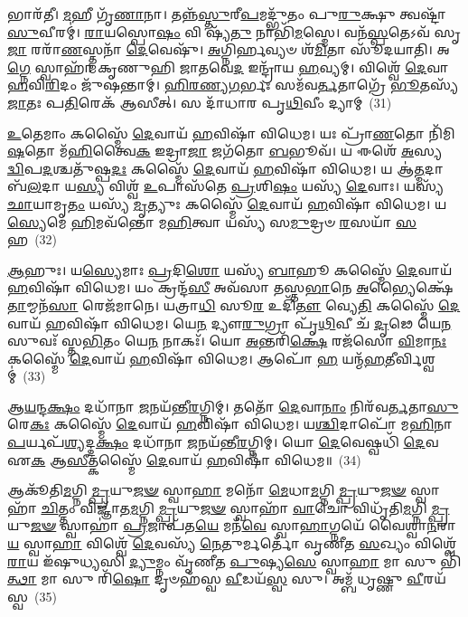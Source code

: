 𑌭𑌾𑌰᳴𑌤𑍀। \ul{𑌮}\-𑌹𑍀 𑌗𑍃᳴\-\ul{𑌣𑌾}\-𑌨𑌾। 𑌤𑌨𑍍𑌨᳴\-\ul{𑌸𑍍𑌤𑍁}\-𑌰𑍀\-\ul{𑌪}\-𑌮𑌦𑍍𑌭𑍁᳴𑌤𑌂 𑌪𑍁\-\ul{𑌰𑍁}\-𑌕𑍍𑌷𑍁 𑌤𑍍𑌵𑌷𑍍𑌟𑌾᳴ \ul{𑌸𑍁}\-𑌵𑍀𑌰𑌮𑍍॑। \ul{𑌰𑌾}\-𑌯𑌸𑍍𑌪𑍋\-\ul{𑌷𑌂} 𑌵𑌿 𑌷𑍍𑌯᳴\-\ul{𑌤𑍁} 𑌨𑌾𑌭𑌿᳴\-\ul{𑌮}\-𑌸𑍍𑌮𑍇। 𑌵𑌨᳴\-\ul{𑌸𑍍𑌪}\-𑌤𑍇\-𑌽𑌵᳴ 𑌸𑍃\-\ul{𑌜𑌾} 𑌰𑌰𑌾᳴\-\ul{𑌣}\-𑌸𑍍𑌤𑍍𑌮𑌨𑌾᳴ \ul{𑌦𑍇}\-𑌵𑍇𑌷𑍁᳴। \ul{𑌅}\-𑌗𑍍𑌨𑌿𑌰𑍍\mbox{}\-\ul{𑌹}\-𑌵𑍍𑌯𑍞 𑌶᳴\-\ul{𑌮𑌿}\-𑌤𑌾 𑌸𑍂᳴𑌦𑌯𑌾𑌤𑌿। 𑌅\-\ul{𑌗𑍍𑌨𑍇} 𑌸𑍍𑌵𑌾𑌹𑌾᳴ 𑌕𑍃𑌣𑍁𑌹𑌿 𑌜𑌾𑌤𑌵𑍇\-\ul{𑌦} 𑌇𑌨𑍍𑌦𑍍𑌰𑌾᳴𑌯 \ul{𑌹}\-𑌵𑍍𑌯𑌮𑍍। 𑌵𑌿𑌶𑍍𑌵𑍇᳴ \ul{𑌦𑍇}\-𑌵𑌾 \ul{𑌹}\-𑌵𑌿\-\ul{𑌰𑌿}\-𑌦𑌂 𑌜𑍁᳴𑌷𑌨𑍍𑌤𑌾𑌮𑍍। \ul{𑌹𑌿}\-\-\ul{𑌰}\-\-\ul{𑌣𑍍𑌯}\-\-\ul{𑌗}\-𑌰𑍍𑌭𑌃 𑌸𑌮᳴𑌵\-\ul{𑌰𑍍𑌤}\-𑌤𑌾𑌗𑍍𑌰𑍇᳴ \ul{𑌭𑍂}\-𑌤𑌸𑍍𑌯᳴ \ul{𑌜𑌾}\-𑌤𑌃 𑌪\-\ul{𑌤𑌿}\-𑌰𑍇𑌕᳴ 𑌆𑌸𑍀𑌤𑍍। 𑌸 𑌦𑌾᳴𑌧𑌾𑌰 𑌪𑍃\-\ul{𑌥𑌿}\-𑌵𑍀𑌂 𑌦𑍍𑌯𑌾𑌮𑍍~(31)

\-\ul{𑌉}\-𑌤𑍇𑌮𑌾𑌂 𑌕𑌸𑍍𑌮𑍈᳴ \ul{𑌦𑍇}\-𑌵𑌾𑌯᳴ \ul{𑌹}\-𑌵𑌿𑌷𑌾᳴ 𑌵𑌿𑌧𑍇𑌮। 𑌯𑌃 𑌪𑍍𑌰𑌾᳴\-\ul{𑌣}\-𑌤𑍋 𑌨𑌿᳴𑌮𑌿\-\ul{𑌷}\-𑌤𑍋 𑌮᳴\-\ul{𑌹𑌿}\-𑌤𑍍𑌵𑍈\-\ul{𑌕} 𑌇𑌦𑍍𑌰𑌾\-\ul{𑌜𑌾} 𑌜𑌗᳴𑌤𑍋 \ul{𑌬}\-𑌭𑍂𑌵᳴। 𑌯 𑌈𑌶𑍇᳴ \ul{𑌅}\-𑌸𑍍𑌯 \ul{𑌦𑍍𑌵𑌿}\-𑌪\-\ul{𑌦}\-𑌶𑍍𑌚𑌤𑍁᳴𑌷𑍍𑌪\-\ul{𑌦𑌃} 𑌕𑌸𑍍𑌮𑍈᳴ \ul{𑌦𑍇}\-𑌵𑌾𑌯᳴ \ul{𑌹}\-𑌵𑌿𑌷𑌾᳴ 𑌵𑌿𑌧𑍇𑌮। 𑌯 𑌆॑\-\ul{𑌤𑍍𑌮}\-𑌦𑌾 𑌬᳴\-\ul{𑌲}\-𑌦𑌾 𑌯\-\ul{𑌸𑍍𑌯} 𑌵𑌿𑌶𑍍𑌵᳴ \ul{𑌉}\-𑌪𑌾𑌸᳴𑌤𑍇 \ul{𑌪𑍍𑌰}\-𑌶𑌿\-\ul{𑌷𑌂} 𑌯𑌸𑍍𑌯᳴ \ul{𑌦𑍇}\-𑌵𑌾𑌃। 𑌯𑌸𑍍𑌯᳴ \ul{𑌛𑌾}\-𑌯𑌾𑌮𑍃\-\ul{𑌤𑌂} 𑌯𑌸𑍍𑌯᳴ \ul{𑌮𑍃}\-𑌤𑍍𑌯𑍁𑌃 𑌕𑌸𑍍𑌮𑍈᳴ \ul{𑌦𑍇}\-𑌵𑌾𑌯᳴ \ul{𑌹}\-𑌵𑌿𑌷𑌾᳴ 𑌵𑌿𑌧𑍇𑌮। 𑌯\-\ul{𑌸𑍍𑌯𑍇}\-𑌮𑍇 \ul{𑌹𑌿}\-𑌮𑌵᳴𑌨𑍍𑌤𑍋 𑌮\-\ul{𑌹𑌿}\-𑌤𑍍𑌵𑌾 𑌯𑌸𑍍𑌯᳴ 𑌸\-\ul{𑌮𑍁}\-𑌦𑍍𑌰𑍞 \ul{𑌰}\-𑌸𑌯𑌾᳴ \ul{𑌸}\-𑌹~(32)

\-\ul{𑌆}\-𑌹𑍁𑌃। 𑌯\-\ul{𑌸𑍍𑌯𑍇}\-𑌮𑌾𑌃 \ul{𑌪𑍍𑌰}\-𑌦𑌿\-\ul{𑌶𑍋} 𑌯𑌸𑍍𑌯᳴ \ul{𑌬𑌾}\-𑌹𑍂 𑌕𑌸𑍍𑌮𑍈᳴ \ul{𑌦𑍇}\-𑌵𑌾𑌯᳴ \ul{𑌹}\-𑌵𑌿𑌷𑌾᳴ 𑌵𑌿𑌧𑍇𑌮। 𑌯𑌂 𑌕𑍍𑌰𑌨𑍍𑌦᳴\-\ul{𑌸𑍀} 𑌅𑌵᳴𑌸𑌾 𑌤𑌸𑍍𑌤\-\ul{𑌭𑌾}\-𑌨𑍇 \ul{𑌅}\-𑌭𑍍𑌯𑍈𑌕𑍍𑌷𑍇᳴\-\ul{𑌤𑌾}\-𑌮𑍍𑌮𑌨᳴\-\ul{𑌸𑌾} 𑌰𑍇𑌜᳴𑌮𑌾𑌨𑍇। 𑌯𑌤𑍍𑌰𑌾\-\ul{𑌧𑌿} 𑌸𑍂\-\ul{𑌰} 𑌉𑌦𑌿᳴\-\ul{𑌤𑍗} 𑌵𑍍𑌯𑍇\-\ul{𑌤𑌿} 𑌕𑌸𑍍𑌮𑍈᳴ \ul{𑌦𑍇}\-𑌵𑌾𑌯᳴ \ul{𑌹}\-𑌵𑌿𑌷𑌾᳴ 𑌵𑌿𑌧𑍇𑌮। 𑌯𑍇\-\ul{𑌨} 𑌦𑍍𑌯𑍗\-\ul{𑌰𑍁}\-𑌗𑍍𑌰𑌾 𑌪𑍃᳴\-\ul{𑌥𑌿}\-𑌵𑍀 𑌚᳴ \ul{𑌦𑍃}\-𑌢𑍇 𑌯𑍇\-\ul{𑌨} 𑌸𑍁𑌵𑌃᳴ 𑌸𑍍𑌤\-\ul{𑌭𑌿}\-𑌤𑌂 𑌯𑍇\-\ul{𑌨} 𑌨𑌾𑌕𑌃᳴। 𑌯𑍋 \ul{𑌅}\-𑌨𑍍𑌤𑌰𑌿᳴\-\ul{𑌕𑍍𑌷𑍇} 𑌰𑌜᳴𑌸𑍋 \ul{𑌵𑌿}\-𑌮𑌾\-\ul{𑌨𑌃} 𑌕𑌸𑍍𑌮𑍈᳴ \ul{𑌦𑍇}\-𑌵𑌾𑌯᳴ \ul{𑌹}\-𑌵𑌿𑌷𑌾᳴ 𑌵𑌿𑌧𑍇𑌮। 𑌆𑌪𑍋᳴ \ul{𑌹} 𑌯𑌨𑍍𑌮᳴\-\ul{𑌹}\-𑌤𑍀𑌰𑍍𑌵𑌿𑌶𑍍𑌵𑌮𑍍॑~(33)

𑌆\-\ul{𑌯}\-𑌨𑍍𑌦\-\ul{𑌕𑍍𑌷𑌂} 𑌦𑌧𑌾᳴𑌨𑌾 \ul{𑌜}\-𑌨𑌯᳴𑌨𑍍𑌤𑍀\-\ul{𑌰}\-𑌗𑍍𑌨𑌿𑌮𑍍। 𑌤𑌤𑍋᳴ \ul{𑌦𑍇}\-𑌵𑌾\-\ul{𑌨𑌾𑌂} 𑌨𑌿𑌰᳴𑌵\-\ul{𑌰𑍍𑌤}\-𑌤𑌾\-\ul{𑌸𑍁}\-𑌰𑍇\-\ul{𑌕𑌃} 𑌕𑌸𑍍𑌮𑍈᳴ \ul{𑌦𑍇}\-𑌵𑌾𑌯᳴ \ul{𑌹}\-𑌵𑌿𑌷𑌾᳴ 𑌵𑌿𑌧𑍇𑌮। 𑌯\-\ul{𑌶𑍍𑌚𑌿}\-𑌦𑌾𑌪𑍋᳴ 𑌮\-\ul{𑌹𑌿}\-𑌨𑌾 \ul{𑌪}\-𑌰𑍍𑌯𑌪᳴\-\ul{𑌶𑍍𑌯}\-𑌦𑍍𑌦\-\ul{𑌕𑍍𑌷𑌂} 𑌦𑌧𑌾᳴𑌨𑌾 \ul{𑌜}\-𑌨𑌯᳴𑌨𑍍𑌤𑍀\-\ul{𑌰}\-𑌗𑍍𑌨𑌿𑌮𑍍। 𑌯𑍋 \ul{𑌦𑍇}\-𑌵𑍇𑌷𑍍𑌵𑌧𑌿᳴ \ul{𑌦𑍇}\-𑌵 𑌏\-\ul{𑌕} 𑌆\-\ul{𑌸𑍀}\-𑌤𑍍𑌕𑌸𑍍𑌮𑍈᳴ \ul{𑌦𑍇}\-𑌵𑌾𑌯᳴ \ul{𑌹}\-𑌵𑌿𑌷𑌾᳴ 𑌵𑌿𑌧𑍇𑌮॥~(34)

{\anuvakamend[{\-\ul{𑌅}\-𑌗𑍍𑌨𑍇𑌃 𑌸 𑌸𑌰᳴𑌸𑍍𑌵\-\ul{𑌤𑍀} 𑌦𑍍𑌯𑌾𑍞 \ul{𑌸}\-𑌹 𑌵𑌿\-\ul{𑌶𑍍𑌵}\-𑌞𑍍𑌚𑌤𑍁᳴𑌸𑍍𑌤𑍍𑌰𑌿H𑍞𑌶𑌶𑍍𑌚}]}%

𑌆𑌕𑍂᳴𑌤𑌿\-\ul{𑌮}\-𑌗𑍍𑌨𑌿\-\ul{𑌮𑍍𑌪𑍍𑌰}\-𑌯𑍁\-\ul{𑌜}\-\-\ul{𑍟} 𑌸𑍍𑌵𑌾\-\ul{𑌹𑌾} 𑌮𑌨𑍋᳴ \ul{𑌮𑍇}\-𑌧𑌾\-\ul{𑌮}\-𑌗𑍍𑌨𑌿\-\ul{𑌮𑍍𑌪𑍍𑌰}\-𑌯𑍁\-\ul{𑌜}\-\-\ul{𑍟} 𑌸𑍍𑌵𑌾𑌹𑌾᳴ \ul{𑌚𑌿}\-𑌤𑍍𑌤𑌂 𑌵𑌿𑌜𑍍𑌞𑌾᳴𑌤\-\ul{𑌮}\-𑌗𑍍𑌨𑌿\-\ul{𑌮𑍍𑌪𑍍𑌰}\-𑌯𑍁\-\ul{𑌜}\-\-\ul{𑍟} 𑌸𑍍𑌵𑌾𑌹𑌾᳴ \ul{𑌵𑌾}\-𑌚𑍋 𑌵𑌿𑌧𑍃᳴𑌤𑌿\-\ul{𑌮}\-𑌗𑍍𑌨𑌿\-\ul{𑌮𑍍𑌪𑍍𑌰}\-𑌯𑍁\-\ul{𑌜}\-\-\ul{𑍟} 𑌸𑍍𑌵𑌾𑌹𑌾॑ \ul{𑌪𑍍𑌰}\-𑌜𑌾𑌪᳴𑌤\-\ul{𑌯𑍇} 𑌮𑌨᳴\-\ul{𑌵𑍇} 𑌸𑍍𑌵𑌾\-\ul{𑌹𑌾}\-𑌗𑍍𑌨𑌯𑍇᳴ 𑌵𑍈𑌶𑍍𑌵𑌾\-\ul{𑌨}\-𑌰𑌾\-\ul{𑌯} 𑌸𑍍𑌵𑌾\-\ul{𑌹𑌾} 𑌵𑌿𑌶𑍍𑌵𑍇᳴ \ul{𑌦𑍇}\-𑌵𑌸𑍍𑌯᳴ \ul{𑌨𑍇}\-𑌤𑍁𑌰𑍍𑌮𑌰𑍍𑌤𑍋᳴ 𑌵𑍃𑌣𑍀𑌤 \ul{𑌸}\-𑌖𑍍𑌯𑌂 𑌵𑌿𑌶𑍍𑌵𑍇᳴ \ul{𑌰𑌾}\-𑌯 𑌇᳴𑌷𑍁𑌧𑍍𑌯𑌸𑌿 \ul{𑌦𑍍𑌯𑍁}\-𑌮𑍍𑌨𑌂 𑌵𑍃᳴𑌣𑍀𑌤 \ul{𑌪𑍁}\-𑌷𑍍𑌯\-\ul{𑌸𑍇} 𑌸𑍍𑌵𑌾\-\ul{𑌹𑌾} 𑌮𑌾 𑌸𑍁 𑌭𑌿᳴\-\ul{𑌤𑍍𑌥𑌾} 𑌮𑌾 𑌸𑍁 𑌰𑌿᳴\-\ul{𑌷𑍋} 𑌦𑍃𑍞𑌹᳴𑌸𑍍𑌵 \ul{𑌵𑍀}\-𑌡𑌯᳴\-\ul{𑌸𑍍𑌵} 𑌸𑍁। 𑌅𑌮𑍍𑌬᳴ 𑌧𑍃𑌷𑍍𑌣𑍁 \ul{𑌵𑍀}\-𑌰𑌯᳴𑌸𑍍𑌵~(35)

